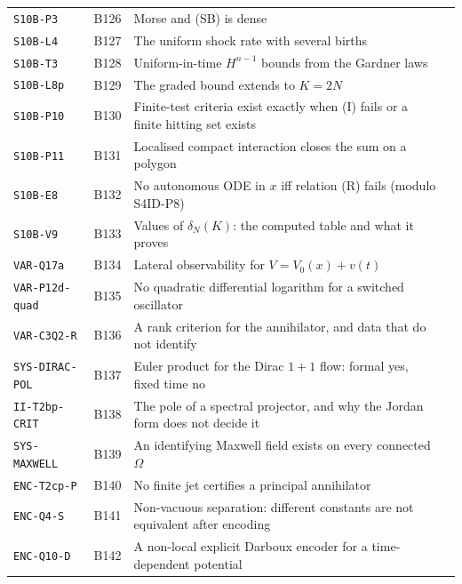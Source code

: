 \documentclass[11pt,a4paper,oneside]{report}
\begin{document}
\begin{center}
\begin{longtable}{@{}L{3.6cm}L{1.2cm}L{8.0cm}L{1.2cm}@{}}
\texttt{S10B-P3} & B126 & Morse and (SB) is dense & \pageref{dim:S10B-P3}\\
\texttt{S10B-L4} & B127 & The uniform shock rate with several births & \pageref{dim:S10B-L4}\\
\texttt{S10B-T3} & B128 & Uniform-in-time $H^{n-1}$ bounds from the Gardner laws & \pageref{dim:S10B-T3}\\
\texttt{S10B-L8p} & B129 & The graded bound extends to $K=2N$ & \pageref{dim:S10B-L8p}\\
\texttt{S10B-P10} & B130 & Finite-test criteria exist exactly when (I) fails or a finite hitting set exists & \pageref{dim:S10B-P10}\\
\texttt{S10B-P11} & B131 & Localised compact interaction closes the sum on a polygon & \pageref{dim:S10B-P11}\\
\texttt{S10B-E8} & B132 & No autonomous ODE in $x$ iff relation (R) fails (modulo S4ID-P8) & \pageref{dim:S10B-E8}\\
\texttt{S10B-V9} & B133 & Values of $\delta_N(K)$: the computed table and what it proves & \pageref{dim:S10B-V9}\\
\texttt{VAR-Q17a} & B134 & Lateral observability for $V=V_0(x)+v(t)$ & \pageref{dim:VAR-Q17a}\\
\texttt{VAR-P12d-quad} & B135 & No quadratic differential logarithm for a switched oscillator & \pageref{dim:VAR-P12d-quad}\\
\texttt{VAR-C3Q2-R} & B136 & A rank criterion for the annihilator, and data that do not identify & \pageref{dim:VAR-C3Q2-R}\\
\texttt{SYS-DIRAC-POL} & B137 & Euler product for the Dirac $1{+}1$ flow: formal yes, fixed time no & \pageref{dim:SYS-DIRAC-POL}\\
\texttt{II-T2bp-CRIT} & B138 & The pole of a spectral projector, and why the Jordan form does not decide it & \pageref{dim:II-T2bp-CRIT}\\
\texttt{SYS-MAXWELL} & B139 & An identifying Maxwell field exists on every connected $\Omega$ & \pageref{dim:SYS-MAXWELL}\\
\texttt{ENC-T2cp-P} & B140 & No finite jet certifies a principal annihilator & \pageref{dim:ENC-T2cp-P}\\
\texttt{ENC-Q4-S} & B141 & Non-vacuous separation: different constants are not equivalent after encoding & \pageref{dim:ENC-Q4-S}\\
\texttt{ENC-Q10-D} & B142 & A non-local explicit Darboux encoder for a time-dependent potential & \pageref{dim:ENC-Q10-D}\\

\end{longtable}
\end{center}
\end{document}
